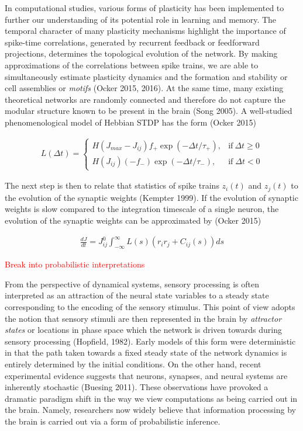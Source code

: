 \documentclass{ucetd}
\begin{document}
In computational studies, various forms of plasticity has been implemented to further our understanding of its potential role in learning and memory. The temporal character of many plasticity mechanisms highlight the importance of spike-time correlations, generated by recurrent feedback or feedforward projections, determines the topological evolution of the network. By making approximations of the correlations between spike trains, we are able to simultaneously estimate plasticity dynamics and the formation and stability or cell assemblies or \emph{motifs} (Ocker 2015, 2016). At the same time, many existing theoretical networks are randomly connected and therefore do not capture the modular structure known to be present in the brain (Song 2005). A well-studied phenomenological model of Hebbian STDP has the form (Ocker 2015)

\begin{align*}
L(\Delta t) = \begin{cases}
      H(J_{max}-J_{ij})f_{+}\exp(-\Delta t/\tau_{+}), & \text{if}\ \Delta t \geq 0 \\
       H(J_{ij})(-f_{-})\exp(-\Delta t/\tau_{-}), & \text{if} \;\Delta t < 0
    \end{cases}
\end{align*}

The next step is then to relate that statistics of spike trains $z_{i}(t)$ and $z_{j}(t)$ to the evolution of the synaptic weights (Kempter 1999). If the evolution of synaptic weights is slow compared to the integration timescale of a single neuron, the evolution of the synaptic weights can be approximated by (Ocker 2015)

\begin{align}
\frac{dJ}{dt} = J_{ij}^{0}\int_{-\infty}^{\infty} L(s)(r_{i}r_{j} + C_{ij}(s))ds
\end{align}



\textcolor{red}{Break into probabilistic interpretations}

From the perspective of dynamical systems, sensory processing is often interpreted as an attraction of the neural state variables to a steady state corresponding to the encoding of the sensory stimulus. This point of view adopts the notion that sensory stimuli are then represented in the brain by \emph{attractor states} or locations in phase space which the network is driven towards during sensory processing (Hopfield, 1982). Early models of this form were deterministic in that the path taken towards a fixed steady state of the network dynamics is entirely determined by the initial conditions. On the other hand, recent experimental evidence suggests that neurons, synapses, and neural systems are inherently stochastic (Buesing 2011). These observations have provoked a dramatic paradigm shift in the way we view computations as being carried out in the brain. Namely, researchers now widely believe that information processing by the brain is carried out via a form of probabilistic inference.
\end{document}
